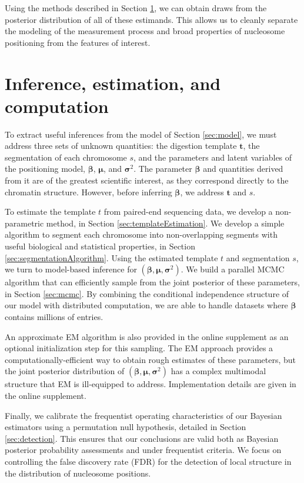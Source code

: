 Using the methods described in Section \ref{sec:estimation}, we can obtain draws from the posterior distribution of all of these estimands.
This allows us to cleanly separate the modeling of the measurement process and broad properties of nucleosome positioning from the features of interest.

\section{Inference, estimation, and computation}
\label{sec:estimation}

To extract useful inferences from the model of Section \ref{sec:model}, we must address three sets of unknown quantities: the digestion template $\bm t$, the segmentation of each chromosome $s$, and the parameters and latent variables of the positioning model, $\bm \beta$, $\bm \mu$, and $\bm \sigma^2$.
The parameter $\bm \beta$ and quantities derived from it are of the greatest scientific interest, as they correspond directly to the chromatin structure.
However, before inferring $\bm \beta$, we address $\bm t$ and $s$.

To estimate the template $t$ from paired-end sequencing data, we develop a non-parametric method, in Section \ref{sec:templateEstimation}.
We develop a simple algorithm to segment each chromosome into non-overlapping segments with useful biological and statistical properties, in Section \ref{sec:segmentationAlgorithm}.
%
Using the estimated template $t$ and segmentation $s$, we turn to model-based inference for $(\bm \beta, \bm \mu, \bm \sigma^2)$.
We build a parallel MCMC algorithm that can efficiently sample from the joint posterior of these parameters,  in Section \ref{sec:mcmc}.
By combining the conditional independence structure of our model with distributed computation, we are able to handle datasets where $\bm \beta$ contains millions of entries.

An approximate EM algorithm is also provided in the online supplement %
as an optional initialization step for this sampling.
The EM approach provides a computationally-efficient way to obtain rough estimates of these parameters, but the joint posterior distribution of $(\bm \beta, \bm \mu, \bm \sigma^2)$ has a complex multimodal structure that EM is ill-equipped to address.
Implementation details are given in the online supplement. %

Finally, we calibrate the frequentist operating characteristics of our Bayesian estimators using a permutation null hypothesis, detailed in Section \ref{sec:detection}.
This ensures that our conclusions are valid both as Bayesian posterior probability assessments and under frequentist criteria.
We focus on controlling the false discovery rate (FDR) for the detection of local structure in the distribution of nucleosome positions.


